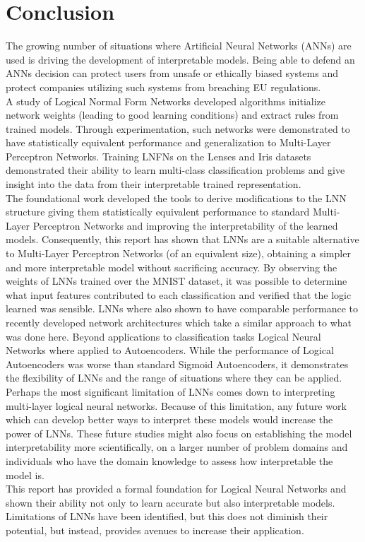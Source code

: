 \chapter{Conclusion}\label{C:con}
The growing number of situations where Artificial Neural Networks (ANNs) are used is driving the development of interpretable models. Being able to defend an ANNs decision can protect users from unsafe or ethically biased systems and protect companies utilizing such systems from breaching EU regulations.\\

A study of Logical Normal Form Networks developed algorithms initialize network weights (leading to good learning conditions) and extract rules from trained models. Through experimentation, such networks were demonstrated to have statistically equivalent performance and generalization to Multi-Layer Perceptron Networks. Training LNFNs on the Lenses and Iris datasets demonstrated their ability to learn multi-class classification problems and give insight into the data from their interpretable trained representation.\\

The foundational work developed the tools to derive modifications to the LNN structure giving them statistically equivalent performance to standard Multi-Layer Perceptron Networks and improving the interpretability of the learned models. Consequently, this report has shown that LNNs are a suitable alternative to Multi-Layer Perceptron Networks (of an equivalent size), obtaining a simpler and more interpretable model without sacrificing accuracy. By observing the weights of LNNs trained over the MNIST dataset, it was possible to determine what input features contributed to each classification and verified that the logic learned was sensible. LNNs where also shown to have comparable performance to recently developed network architectures which take a similar approach to what was done here. Beyond applications to classification tasks Logical Neural Networks where applied to Autoencoders. While the performance of Logical Autoencoders was worse than standard Sigmoid Autoencoders, it demonstrates the flexibility of LNNs and the range of situations where they can be applied.\\

Perhaps the most significant limitation of LNNs comes down to interpreting multi-layer logical neural networks. Because of this limitation, any future work which can develop better ways to interpret these models would increase the power of LNNs. These future studies might also focus on establishing the model interpretability more scientifically, on a larger number of problem domains and individuals who have the domain knowledge to assess how interpretable the model is.\\

This report has provided a formal foundation for Logical Neural Networks and shown their ability not only to learn accurate but also interpretable models. Limitations of LNNs have been identified, but this does not diminish their potential, but instead, provides avenues to increase their application.




